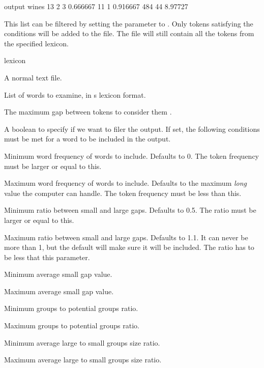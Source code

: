 \documentclass[a4paper,10pt,twoside]{report}
\begin{document}
\begin{wout}{ output}
wines 13 2 3 0.666667 11 1 0.916667 484 44 8.97727
\end{wout}

This list can be filtered by setting the  parameter to
. Only tokens satisfying the conditions will be added to the
 file. The  file will still contain all the tokens
from the specified lexicon.

\begin{varlist}{lexicon}
\item[filename] A normal text file.
\item[lexicon] List of words to examine, in \wopr{}s lexicon format.
\item[gap] The maximum gap between tokens to consider them
  .
\item[filter] A boolean to specify if we want to filer the 
  output. If set, the following conditions must be met for a word
  to be included in the output.
\item[min\_f] Minimum word frequency of words to include. Defaults to
  0. The token frequency must be larger or equal to this.
\item[max\_f] Maximum word frequency of words to include. Defaults to
  the maximum \emph{long} value the computer can handle. The token
  frequency must be less than this.
\item[min\_r] Minimum ratio between small and large gaps. Defaults to
  0.5. The ratio must be larger or equal to this.
\item[max\_r] Maximum ratio between small and large gaps. Defaults to
  1.1. It can never be more than 1, but the default will make sure it
  will be included. The ratio has to be less that this parameter.
\item[min\_a] Minimum average small gap value.
\item[max\_a] Maximum average small gap value.
\item[min\_p] Minimum groups to potential groups ratio.
\item[max\_p] Maximum groups to potential groups ratio.
\item[min\_g] Minimum average large to small groups size ratio.
\item[max\_g] Maximum average large to small groups size ratio. 
\end{varlist}

\end{document}
